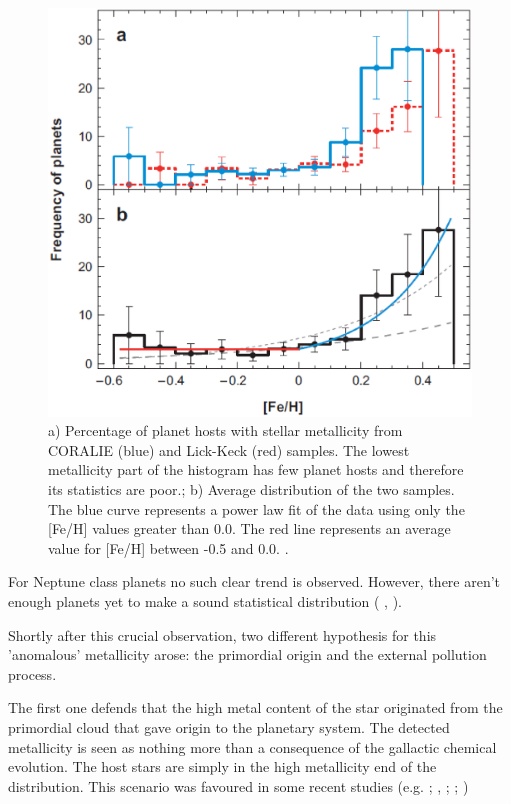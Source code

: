 \documentclass[dvips,12pt,a4paper]{report}
\begin{document}
\begin{figure}[h]
\centering
\includegraphics[height=10 cm]{pics/fehhist}
\caption[Histograms of Frequency of planets with metallicity ]{a) Percentage of planet hosts with stellar metallicity from CORALIE (blue) and Lick-Keck (red) samples. The lowest metallicity part of the histogram has few planet hosts and therefore its statistics are poor.; b) Average distribution of the two samples. The blue curve represents a power law fit of the data using only the [Fe/H] values greater than 0.0. The red line represents an average value for [Fe/H] between -0.5 and 0.0. \citep{Udry-2007}.}
\label{histfeh}
\end{figure}

For Neptune class planets no such clear trend is observed. However, there aren't enough planets yet to make a sound statistical distribution (\citeauthor{Udry-2006} \citeyear{Udry-2006}, \citeauthor{Sousa-2008} \citeyear{Sousa-2008}).

Shortly after this crucial observation, two different hypothesis for this 'anomalous' metallicity arose: the primordial origin and the external pollution process. 

The first one defends that the high metal content of the star originated from the primordial cloud that gave origin to the planetary system. The detected metallicity is seen as nothing more than a consequence of the gallactic chemical evolution. The host stars are simply in the high metallicity end of the distribution. This scenario was favoured in some recent studies (e.g. \citeauthor{Sadakane-2002} \citeyear{Sadakane-2002}; \citeauthor{Santos-2003} \citeyear{Santos-2003}, \citeyear{Santos-2005a}; \citeauthor{Fischer-2005} \citeyear{Fischer-2005}; \citeauthor{Ecuvillon-2006b} \citeyear{Ecuvillon-2006b}) 
\end{document}
